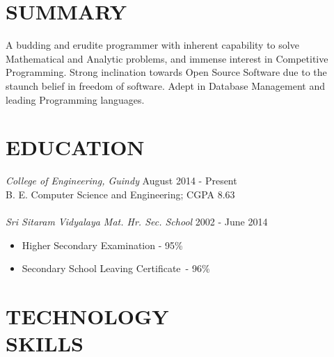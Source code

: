 \documentclass[margin, 10pt]{res} %
\begin{document}
\begin{resume}

 
\section{SUMMARY}  

A budding and erudite programmer with inherent capability to solve Mathematical and Analytic problems, and immense interest in Competitive Programming. Strong inclination towards Open Source Software due to the staunch belief in freedom of software. Adept in Database Management and leading Programming languages.


\section{EDUCATION}

{\sl College of Engineering, Guindy}  \hfill August 2014 - Present \\
B. E. Computer Science and Engineering; CGPA 8.63\\\\
{\sl Sri Sitaram Vidyalaya Mat. Hr. Sec. School}  \hfill 2002 - June 2014
\begin{itemize}
  \item Higher Secondary Examination \hspace{27pt}- 95\%
  \item Secondary School Leaving Certificate \,- 96\%
\end{itemize}
 

\section{TECHNOLOGY \\ SKILLS} 


\end{resume}
\end{document}
